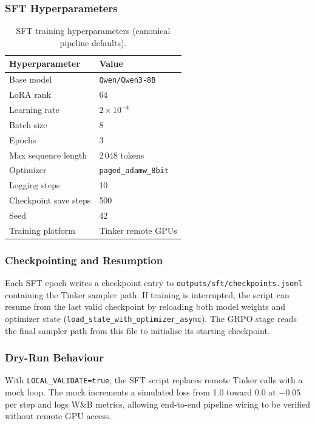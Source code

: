 \documentclass[12pt, a4paper]{article}
\newcommand{\thead}[1]{\textbf{#1}}
\begin{document}
\subsubsection{SFT Hyperparameters}

\begin{table}[H]
\centering
\caption{SFT training hyperparameters (canonical pipeline defaults).}
\begin{tabularx}{\linewidth}{L{5cm} C{9.2cm}}
\toprule
\thead{Hyperparameter} & \thead{Value} \\
\midrule
Base model & \texttt{Qwen/Qwen3-8B} \\
LoRA rank & 64 \\
Learning rate & $2 \times 10^{-4}$ \\
Batch size & 8 \\
Epochs & 3 \\
Max sequence length & 2\,048 tokens \\
Optimizer & \texttt{paged\_adamw\_8bit} \\
Logging steps & 10 \\
Checkpoint save steps & 500 \\
Seed & 42 \\
Training platform & Tinker remote GPUs \\
\bottomrule
\end{tabularx}
\end{table}

\subsubsection{Checkpointing and Resumption}

Each SFT epoch writes a checkpoint entry to \texttt{outputs/sft/checkpoints.jsonl}
containing the Tinker sampler path. If training is interrupted, the script can
resume from the last valid checkpoint by reloading both model weights and
optimizer state (\texttt{load\_state\_with\_optimizer\_async}). The GRPO stage
reads the final sampler path from this file to initialise its starting checkpoint.

\subsubsection{Dry-Run Behaviour}

With \texttt{LOCAL\_VALIDATE=true}, the SFT script replaces remote Tinker calls
with a mock loop. The mock increments a simulated loss from 1.0 toward 0.0 at
$-0.05$ per step and logs W\&B metrics, allowing end-to-end pipeline wiring
to be verified without remote GPU access.
\end{document}
